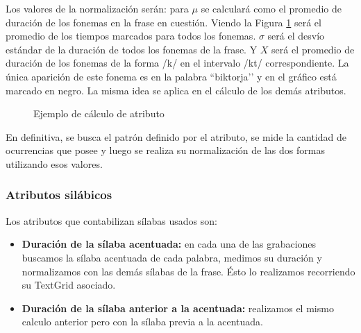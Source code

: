 Los valores de la normalización serán: para $\mu$ se calculará como el promedio de duración de los fonemas en la frase en cuestión. Viendo la Figura \ref{ejemploAtribFon} será el promedio de los tiempos marcados para todos los fonemas. $\sigma$ será el desvío estándar de la duración de todos los fonemas de la frase. Y $X$ será el promedio de duración de los fonemas de la forma /k/ en el intervalo /kt/ correspondiente. La única aparición de este fonema es en la palabra ``biktorja’’ y en el gráfico está marcado en negro. La misma idea se aplica en el cálculo de los demás atributos.

\begin{figure}[H]
\centering
{}
\caption{Ejemplo de cálculo de atributo}
\label{ejemploAtribFon}
\end{figure}

En definitiva, se busca el patrón definido por el atributo, se mide la cantidad de ocurrencias que posee y luego se realiza su normalización de las dos formas utilizando esos valores. 

\subsubsection{Atributos silábicos}

Los atributos que contabilizan sílabas usados son:

\begin{itemize}
    \item \textbf{Duración de la sílaba acentuada:} en cada una de las grabaciones buscamos la sílaba acentuada de cada palabra, medimos su duración y normalizamos con las demás sílabas de la frase. Ésto lo realizamos recorriendo su TextGrid asociado.
    \item \textbf{Duración de la sílaba anterior a la acentuada:} realizamos el mismo calculo anterior pero con la sílaba previa a la acentuada. 
\end{itemize}

